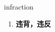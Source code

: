 
\begin{frame}
{\huge infraction}
\begin{center}
\begin{enumerate}\Large
  \item \textbf{违背，违反}
\end{enumerate}
\end{center}
\end{frame}
